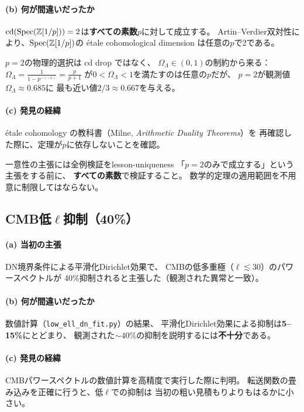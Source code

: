 \paragraph{(b) 何が間違いだったか}
$\operatorname{cd}(\operatorname{Spec}(\mathbb{Z}[1/p])) = 2$は\textbf{すべての素数$p$}に対して成立する。
Artin--Verdier双対性により、$\operatorname{Spec}(\mathbb{Z}[1/p])$の
\'etale cohomological dimension は任意の$p$で2である。

$p = 2$の物理的選択は cd drop ではなく、
$\Omega_\Lambda \in (0,1)$の制約から来る：
$\Omega_\Lambda = \frac{1}{1 - p^{-(-1)}} = \frac{p}{p+1}$
が$0 < \Omega_\Lambda < 1$を満たすのは任意の$p$だが、
$p = 2$が観測値$\Omega_\Lambda \approx 0.685$に
最も近い値$2/3 \approx 0.667$を与える。

\paragraph{(c) 発見の経緯}
\'etale cohomology の教科書（Milne, \emph{Arithmetic Duality Theorems}）を
再確認した際に、定理が$p$に依存しないことを確認。

\begin{keylesson}{一意性の主張には全例検証を}{lesson-uniqueness}
「$p = 2$のみで成立する」という主張をする前に、
\textbf{すべての素数}で検証すること。
数学的定理の適用範囲を不用意に制限してはならない。
\end{keylesson}


\subsection{CMB低$\ell$抑制（40\%）}
\label{sec:15.4}

\paragraph{(a) 当初の主張}
DN境界条件による平滑化Dirichlet効果で、
CMBの低多重極（$\ell \lesssim 30$）のパワースペクトルが
40\%抑制されると主張した（観測された異常と一致）。

\paragraph{(b) 何が間違いだったか}
数値計算（\texttt{low\_ell\_dn\_fit.py}）の結果、
平滑化Dirichlet効果による抑制は\textbf{5--15\%}にとどまり、
観測された$\sim 40\%$の抑制を説明するには\textbf{不十分}である。

\paragraph{(c) 発見の経緯}
CMBパワースペクトルの数値計算を高精度で実行した際に判明。
転送関数の畳み込みを正確に行うと、低$\ell$での抑制は
当初の粗い見積もりよりもはるかに小さい。


